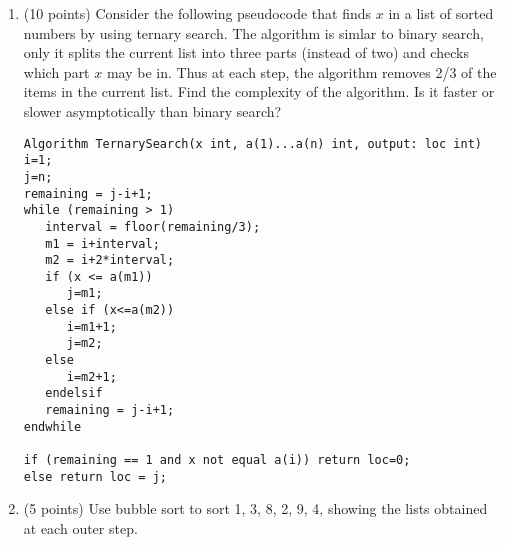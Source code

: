 \documentclass[11pt]{article}
\begin{document}
\begin{enumerate}
\item (10 points) 
Consider the following pseudocode that finds $x$ in a list of sorted
numbers by using ternary search. The algorithm is simlar to binary search, 
only it splits the current list into three parts (instead of two) and checks 
which part $x$ may be in. Thus at each step, the algorithm removes 2/3 of 
the items in the current list.
Find the complexity of the algorithm. Is it faster or slower asymptotically 
than binary search?
{\footnotesize
\begin{verbatim}
Algorithm TernarySearch(x int, a(1)...a(n) int, output: loc int)
i=1; 
j=n;
remaining = j-i+1;
while (remaining > 1)
   interval = floor(remaining/3);
   m1 = i+interval;
   m2 = i+2*interval;
   if (x <= a(m1)) 
      j=m1;
   else if (x<=a(m2))
      i=m1+1;
      j=m2;
   else 
      i=m2+1;
   endelsif
   remaining = j-i+1;
endwhile

if (remaining == 1 and x not equal a(i)) return loc=0;
else return loc = j;
\end{verbatim}
}

\item (5 points) Use bubble sort to sort 1, 3, 8, 2, 9, 4, showing the lists obtained 
at each outer step.



\end{enumerate}
\end{document}
